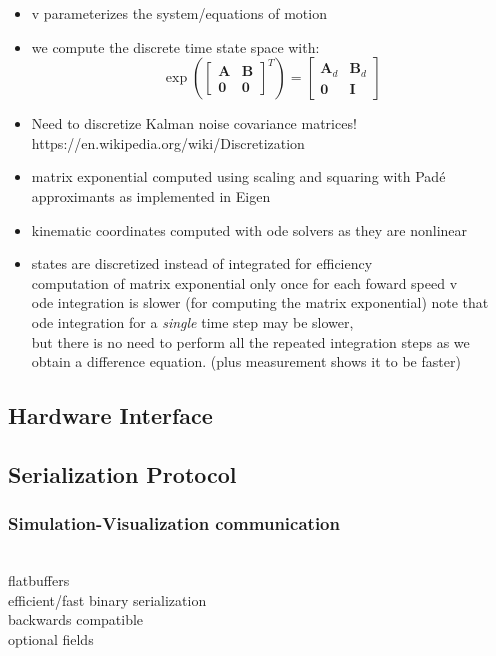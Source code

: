 \documentclass[11pt,a4paper,reqno]{amsart}
\newcommand{\stateMat}{\bm{A}}
\newcommand{\inputMat}{\bm{B}}
\begin{document}
\begin{itemize}
    \item v parameterizes the system/equations of motion
    \item we compute the discrete time state space with:
        \begin{equation}
        \exp(\begin{bmatrix} \stateMat & \inputMat \\ \bm{0} & \bm{0} \end{bmatrix}^T)
            = \begin{bmatrix} \stateMat_d & \inputMat_d \\ \bm{0} & \bm{I} \end{bmatrix}
        \end{equation}
    \item Need to discretize Kalman noise covariance matrices!
        https://en.wikipedia.org/wiki/Discretization
    \item matrix exponential computed using scaling and squaring with
        Pad{\'e} approximants\cite{higham2005} as implemented in Eigen\cite{eigenweb}
    \item kinematic coordinates computed with ode solvers as they are nonlinear
    \item states are discretized instead of integrated for efficiency\\
        computation of matrix exponential only once for each foward speed v\\
        ode integration is slower\cite{moler2003} (for computing the matrix exponential)
        note that ode integration for a \textit{single} time step may be slower, \\
        but there is no need to perform all the repeated integration steps as
        we obtain a difference equation. (plus measurement shows it to be faster)
\end{itemize}
\subsection{Hardware Interface}
\subsection{Serialization Protocol}
\subsubsection{Simulation-Visualization communication} \\
flatbuffers \\
efficient/fast binary serialization \\
backwards compatible \\
optional fields \\
\end{document}
